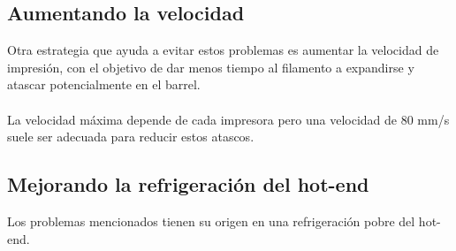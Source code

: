 \documentclass[11pt,a4paper]{article}
\begin{document}
	\subsection{Aumentando la velocidad}
Otra estrategia que ayuda a evitar estos problemas es aumentar la velocidad de impresión, con el objetivo de dar menos tiempo al filamento a expandirse y atascar potencialmente en el barrel.\\\\
La velocidad máxima depende de cada impresora pero una velocidad de 80 mm/s suele ser adecuada para reducir estos atascos.	\subsection{Mejorando la refrigeración del hot-end}
Los problemas mencionados tienen su origen en una refrigeración pobre del hot-end. \\\\
\end{document}
